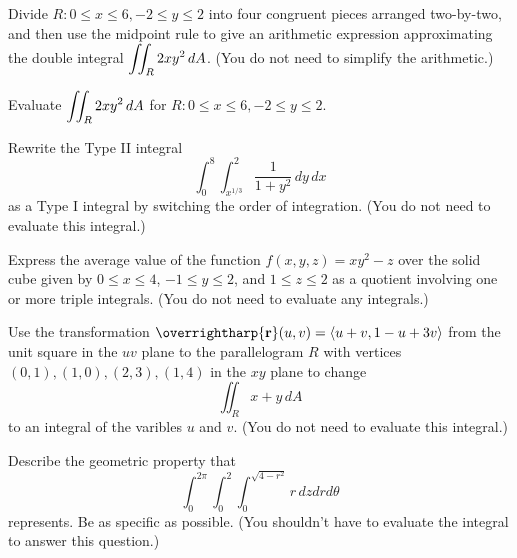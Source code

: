 \documentclass[12pt]{exam}
\newcommand{\ds}{\ensuremath{\displaystyle}}
\newcommand{\harpvec}[1]{\overrightharp{\ensuremath{\mathbf{#1}}}}
\newcommand{\vect}[1]{\harpvec{#1}}
\newcommand{\<}{\langle}
\renewcommand{\>}{\rangle}
\begin{document}
\begin{questions}

\setcounter{question}{0}

\question[5]
  Divide \(R : 0\leq x\leq 6, -2\leq y\leq 2 \)
  into four congruent pieces arranged two-by-two,
  and then use the midpoint rule to give an arithmetic expression
  approximating the double integral
  \(\ds\iint_R 2xy^2 \,dA\). (You do not need to simplify the arithmetic.)

\newpage

\question[5]
  Evaluate
  \(\ds\iint_R 2xy^2 \,dA\)
  for \(R : 0\leq x\leq 6, -2\leq y\leq 2 \).

\newpage

\question[5]
  Rewrite the Type II integral
  \[
    \int_0^8\int_{x^{1/3}}^2 \frac{1}{1+y^2} \,dy\,dx
  \]
  as a Type I integral by switching the order of integration.
  (You do not need to evaluate this integral.)

\newpage

\question[5]
  Express the average value of the function \(f(x,y,z)=xy^2-z\)
  over the solid cube given by \(0\leq x\leq 4\), \(-1\leq y\leq 2\),
  and \(1\leq z\leq 2\) as a quotient involving one or more triple integrals.
  (You do not need to evaluate any integrals.)

\newpage

\question[5]
  Use the transformation \(\vect{r}(u,v)=\<u+v,1-u+3v\>\) from the unit
  square in the \(uv\) plane to the parallelogram \(R\) with vertices
  \((0,1),(1,0),(2,3),(1,4)\) in the \(xy\) plane to change
  \[
    \iint_R x+y \,dA
  \]
  to an integral of the varibles \(u\) and \(v\). (You do not need to
  evaluate this integral.)

\newpage

\question[5]
  Describe the geometric property that
  \[
    \int_0^{2\pi}\int_0^2\int_0^{\sqrt{4-r^2}}r\,dzdrd\theta
  \]
  represents. Be as specific as possible.
  (You shouldn't have to evaluate the integral to answer this question.)


\end{questions}
\end{document}
